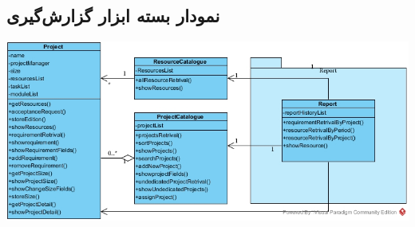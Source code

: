 \newpage
\vspace{1cm}
\subsection{نمودار بسته ابزار گزارش‌گیری}

\vspace{2cm}
\begin{center}
\includegraphics[width=\textwidth]{PackageDiagram/ReportPackage.jpg}
\end{center}